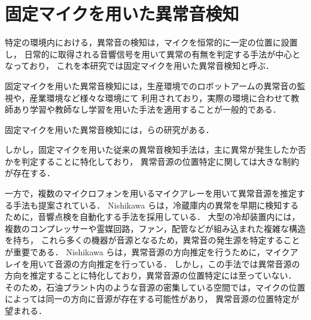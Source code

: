 \documentclass[../main]{subfiles}
\begin{document}
\section{固定マイクを用いた異常音検知}
\label{sec:intro_my_purpose}
特定の環境内における，異常音の検知は，マイクを恒常的に一定の位置に設置し，
日常的に取得される音響信号を用いて異常の有無を判定する手法が中心となっており，
これを本研究では固定マイクを用いた異常音検知と呼ぶ．


固定マイクを用いた異常音検知には，生産環境でのロボットアームの異常音の監視や，産業環境など様々な環境にて
利用されており，実際の環境に合わせて教師あり学習や教師なし学習を用いた手法を適用することが一般的である．

固定マイクを用いた異常音検知には，らの研究がある．

しかし，固定マイクを用いた従来の異常音検知手法は，主に異常が発生したか否かを判定することに特化しており，
異常音源の位置特定に関しては大きな制約が存在する．

一方で，複数のマイクロフォンを用いるマイクアレーを用いて異常音源を推定する手法も提案されている．
Nishikawa らは，冷蔵庫内の異常を早期に検知するために，音響点検を自動化する手法を採用している．
大型の冷却装置内には，複数のコンプレッサーや霊媒回路，ファン，配管などが組み込まれた複雑な構造を持ち，
これら多くの機器が音源となるため，異常音の発生源を特定することが重要である．
Nishikawa らは，異常音源の方向推定を行うために，マイクアレイを用いて音源の方向推定を行っている．
しかし，この手法では異常音源の方向を推定することに特化しており，異常音源の位置特定には至っていない．
そのため，石油プラント内のような音源の密集している空間では，マイクの位置によっては同一の方向に音源が存在する可能性があり，
異常音源の位置特定が望まれる．
\end{document}
